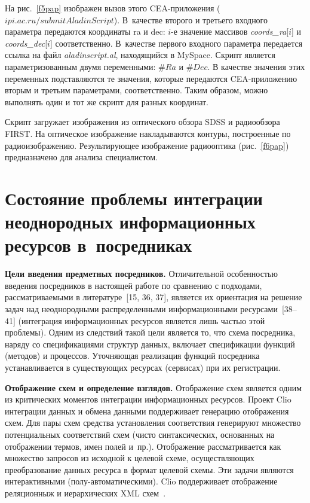 \begin{multicols}{2}

На рис.~\ref{f5pap} изображен вызов этого CEA-при\-ло\-же\-ния
($ipi.ac.ru/submitAladinScript$). В~качестве второго и третьего входного параметра
передаются координаты ra и dec: $i$-е значение массивов \textit{coords\_ra}[$i$] и
\textit{coords\_dec}[$i$] соответственно.
 В~качестве первого входного параметра
передается ссылка на файл \textit{aladinscript.al}, находящийся в My\-Space. Скрипт
является параметризованным двумя переменными: $\#Ra$ и $\#Dec$. В качестве значения
этих переменных подставляются те значения, которые передаются CEA-приложению
вторым и \mbox{третьим} параметрами, соответственно. Таким образом, можно выполнять один и
тот же скрипт для разных координат.

Скрипт загружает изображения из оптического обзора SDSS и радиообзора FIRST.
На оптическое изображение накладываются контуры, построенные по
радиоизображению.
Результирующее изоб\-ра\-же\-ние радиооптика (рис.~\ref{f6pap}) предназначено для анализа
специалистом.


\section{Состояние проблемы интеграции неоднородных информационных ресурсов
в~посредниках}

\noindent
\textbf{Цели введения предметных посредников.} Отличительной
особенностью введения посредников в настоящей работе по сравнению с подходами,
рассматриваемыми в литературе~[15, 36, 37], является их ориентация на
решение задач над неоднородными распределенными информационными
ресурсами~[38--41] (интеграция информационных ресурсов
является лишь частью этой проблемы). Одним из следствий такой цели является то, что
схема посредника, наряду со спецификациями структур данных, включает спецификации
функций (методов) и процессов. Уточняющая реализация функций посредника
устанавливается в существующих ресурсах (сервисах) при их регистрации.
\medskip

\noindent
\textbf{Отображение схем и определение взглядов.} Отображение схем
является одним из критических моментов интеграции информационных ресурсов. Проект
Clio~\cite{Haas05} интеграции данных и обмена данными поддерживает генерацию
отображения схем. Для пары схем средства установления соответствия генерируют
множество потенциальных соответствий схем (чисто синтаксических, основанных на
отоб\-ра\-же\-нии термов, имен полей и~пр.). Отображение рассматривается как множество
запросов из исходной к целевой схеме, осуществляющих преобразование данных ресурса
в формат целевой схемы. Эти задачи являются интерактивными (полу-автоматическими).
Clio поддерживает отображение реляционныж и иерархических XML схем~\cite{Haas05}.


\end{multicols}
